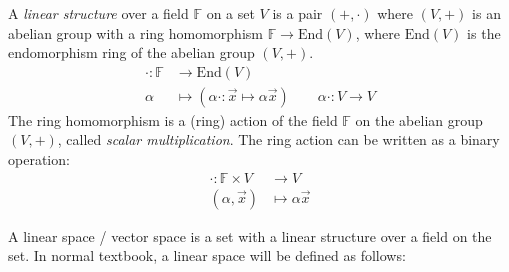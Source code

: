 \documentclass[
	11pt, %
	fleqn, %
	a4paper, %
]{LegrandOrangeBook}
\newcommand{\End}[1]{\text{End}(#1)} %
\newcommand{\F}{\mathbb{F}} %
\begin{document}
\begin{definition}
    A \emph{linear structure} over a field $\F$ on a set $V$ is a pair $(+, \cdot)$ where $(V, +)$ is an abelian group with a ring homomorphism $\F \to \End{V}$, where $\End{V}$ is the endomorphism ring of the abelian group $(V, +)$.
    \[ \begin{split}
            \cdot : \F &\to \End{V} \\
            \alpha &\mapsto (\alpha\cdot : \vec{x} \mapsto \alpha \vec{x}) \qquad \alpha \cdot : V \to V
        \end{split}
    \]
    The ring homomorphism is a (ring) action of the field $\F$ on the abelian group $(V, +)$, called \emph{scalar multiplication}. The ring action can be written as a binary operation:
    \[
        \begin{split}
            \cdot : \F \times V &\to V \\
            (\alpha, \vec{x}) &\mapsto \alpha \vec{x}
        \end{split}
    \]
\end{definition}

A linear space / vector space is a set with a linear structure over a field on the set. In normal textbook, a linear space will be defined as follows:
\end{document}
